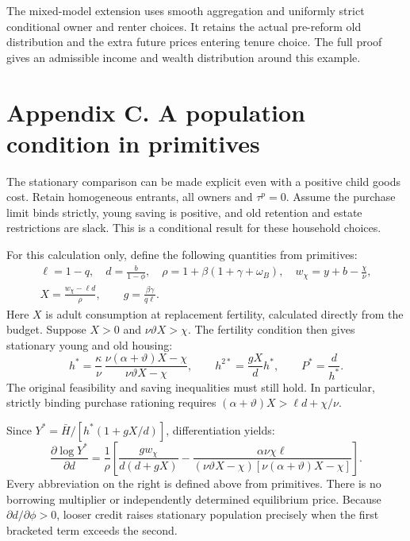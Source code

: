 \documentclass[11pt]{article}
\newcommand{\pageheading}[1]{\section*{#1}}
\begin{document}
The mixed-model extension uses smooth aggregation and uniformly strict
conditional owner and renter choices. It retains the actual pre-reform old
distribution and the extra future prices entering tenure choice. The full
proof gives an admissible income and wealth distribution around this example.

\newpage
\pageheading{Appendix C. A population condition in primitives}

The stationary comparison can be made explicit even with a positive child
goods cost. Retain homogeneous entrants, all owners and $\tau^p=0$.
Assume the purchase limit binds strictly, young saving is positive, and old
retention and estate restrictions are slack. This is a conditional result
for these household choices.

For this calculation only, define the following quantities from primitives:
\begin{gather*}
 \ell=1-q,\quad d=\frac b{1-\phi},\quad
 \rho=1+\beta(1+\gamma+\omega_B),\quad
 w_\chi=y+b-\frac\chi\nu,\\
 X=\frac{w_\chi-\ell d}{\rho},\qquad
 g=\frac{\beta\gamma}{q\ell}.
\end{gather*}
Here $X$ is adult consumption at replacement fertility, calculated directly
from the budget. Suppose $X>0$ and $\nu\vartheta X>\chi$. The fertility
condition then gives stationary young and old housing:
\begin{equation}
 h^*=\frac\kappa\nu\,
 \frac{\nu(\alpha+\vartheta)X-\chi}{\nu\vartheta X-\chi},
 \qquad h^{2*}=\frac{gX}{d}h^*,\qquad P^*=\frac d{h^*}.
 \label{eq:simple_positive_cost_housing}
\end{equation}
The original feasibility and saving inequalities must still hold. In
particular, strictly binding purchase rationing requires
$(\alpha+\vartheta)X>\ell d+\chi/\nu$.

Since $Y^*=\bar H/[h^*(1+gX/d)]$, differentiation yields:
\begin{equation}
 \frac{\partial\log Y^*}{\partial d}
 =\frac1\rho\left[
 \frac{g w_\chi}{d(d+gX)}-
 \frac{\alpha\nu\chi\ell}
 {(\nu\vartheta X-\chi)[\nu(\alpha+\vartheta)X-\chi]}
 \right].
 \label{eq:simple_primitive_population}
\end{equation}
Every abbreviation on the right is defined above from primitives. There is
no borrowing multiplier or independently determined equilibrium price.
Because $\partial d/\partial\phi>0$, looser credit raises stationary population
precisely when the first bracketed term exceeds the second.
\end{document}
